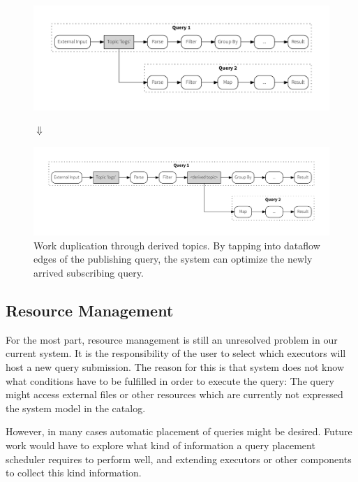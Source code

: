 \begin{figure}[!htb]
  \includegraphics[scale=0.36]{figures/composition/q1q2_man}
  \vspace{-1.5em}
  \begin{center}
  $\Downarrow$
  \end{center}
  \vspace{-1.2em}
  \includegraphics[scale=0.36]{figures/composition/q1q2_auto}
  \caption[Work duplication through derived topics]{
  Work duplication through derived topics. By tapping into dataflow edges
  of the publishing query, the system can optimize the newly arrived
  subscribing query.}
  \label{fig:queryoptimization}
\end{figure}




\subsection{Resource Management}

For the most part, resource management is still an unresolved problem in our
current system. It is the responsibility of the user to select which executors
will host a new query submission. 
The reason for this is that system does not know what conditions have to be
fulfilled in order to execute the query:
The query might access external files or other resources which are currently not
expressed the system model in the catalog.

However, in many cases automatic placement of queries might be desired. Future
work would have to explore what kind of information a query placement scheduler
requires to perform well, and extending executors or other components to collect
this kind information.

